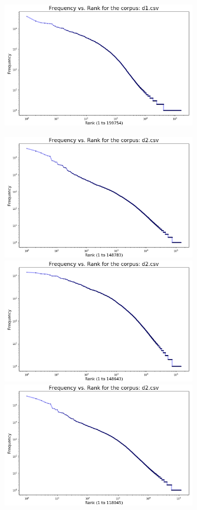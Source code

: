\documentclass{article}
\begin{document}
\begin{flushleft}
\begin{figure}[H]
\begin{minipage}{0.45\linewidth}
\includegraphics[width=0.75\textwidth]{./images/dataset-1-t1-4.png}
\end{minipage}
\hfill
\begin{minipage}{0.45\linewidth}
\centering
\includegraphics[width=0.75\textwidth]{./images/dataset-2-t1-0.png}
\includegraphics[width=0.75\textwidth]{./images/dataset-2-t1-1.png}
\includegraphics[width=0.75\textwidth]{./images/dataset-2-t1-2.png}

\end{minipage}
\end{figure}
\end{flushleft}
\end{document}
